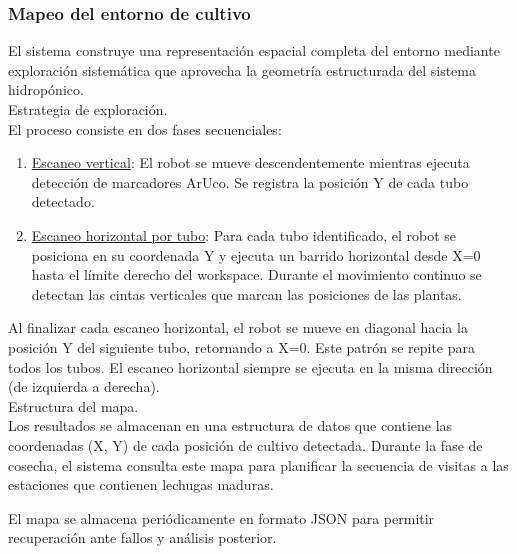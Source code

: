 \subsubsection{Mapeo del entorno de cultivo}

El sistema construye una representación espacial completa del entorno mediante exploración sistemática que aprovecha la geometría estructurada del sistema hidropónico.\\

Estrategia de exploración.\\
\noindent 
El proceso consiste en dos fases secuenciales:

\begin{enumerate}
    \item \underline{Escaneo vertical}: El robot se mueve descendentemente mientras ejecuta detección de marcadores ArUco. Se registra la posición Y de cada tubo detectado.

    \item \underline{Escaneo horizontal por tubo}: Para cada tubo identificado, el robot se posiciona en su coordenada Y y ejecuta un barrido horizontal desde X=0 hasta el límite derecho del workspace. Durante el movimiento continuo se detectan las cintas verticales que marcan las posiciones de las plantas.
\end{enumerate}

Al finalizar cada escaneo horizontal, el robot se mueve en diagonal hacia la posición Y del siguiente tubo, retornando a X=0. Este patrón se repite para todos los tubos. El escaneo horizontal siempre se ejecuta en la misma dirección (de izquierda a derecha).\\

Estructura del mapa.\\
\noindent
Los resultados se almacenan en una estructura de datos que contiene las coordenadas (X, Y) de cada posición de cultivo detectada. Durante la fase de cosecha, el sistema consulta este mapa para planificar la secuencia de visitas a las estaciones que contienen lechugas maduras.

El mapa se almacena periódicamente en formato JSON para permitir recuperación ante fallos y análisis posterior.
